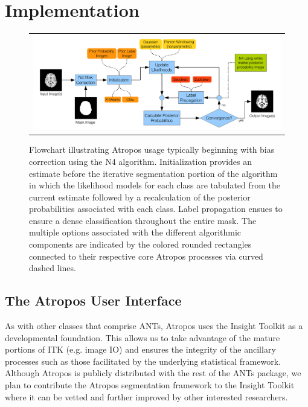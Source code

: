 \documentclass[11pt,english]{article}
\begin{document}
{\section{Implementation} 

\begin{figure}
\begin{center}
\begin{tabular}{c}
\includegraphics[width=160mm]{AtroposFlowchart.pdf}
\end{tabular}
\caption{\baselineskip 12pt \small Flowchart illustrating Atropos usage typically beginning with bias correction using the N4 algorithm.  
Initialization provides an estimate before the iterative segmentation portion of the algorithm in which the 
likelihood models for each class are tabulated from the current estimate followed by a recalculation of the 
posterior probabilities associated with each class.  Label propagation ensues to ensure a dense 
classification throughout the entire mask.   The multiple options associated with the different algorithmic 
components are indicated by the colored rounded rectangles connected to their respective core Atropos 
processes via curved dashed lines.  }
\label{fig:flowchart}
\end{center}
\end{figure}
\subsection{The Atropos User Interface}
As with other classes that comprise ANTs, Atropos uses the Insight Toolkit as a developmental foundation.  
This allows us to take advantage of the mature portions of ITK (e.g. image IO) and ensures the 
integrity of the ancillary processes such as those facilitated by the underlying statistical framework.  Although Atropos is 
publicly distributed with the rest of the ANTs package, we plan to contribute the Atropos segmentation
framework to the Insight Toolkit where it can be vetted and further
improved by other interested researchers. 

}
\end{document}
